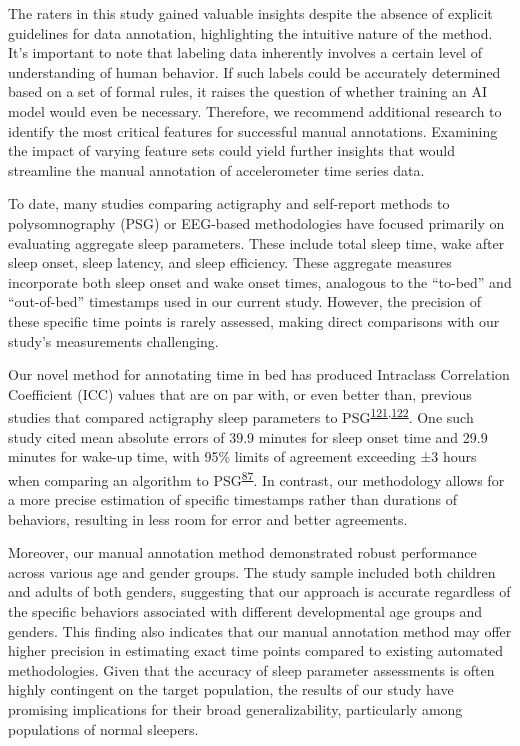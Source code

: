 \documentclass[
  10pt,
]{scrbook}
\begin{document}
The raters in this study gained valuable insights despite the absence of
explicit guidelines for data annotation, highlighting the intuitive
nature of the method. It's important to note that labeling data
inherently involves a certain level of understanding of human behavior.
If such labels could be accurately determined based on a set of formal
rules, it raises the question of whether training an AI model would even
be necessary. Therefore, we recommend additional research to identify
the most critical features for successful manual annotations. Examining
the impact of varying feature sets could yield further insights that
would streamline the manual annotation of accelerometer time series
data.

To date, many studies comparing actigraphy and self-report methods to
polysomnography (PSG) or EEG-based methodologies have focused primarily
on evaluating aggregate sleep parameters. These include total sleep
time, wake after sleep onset, sleep latency, and sleep efficiency. These
aggregate measures incorporate both sleep onset and wake onset times,
analogous to the ``to-bed'' and ``out-of-bed'' timestamps used in our
current study. However, the precision of these specific time points is
rarely assessed, making direct comparisons with our study's measurements
challenging.

Our novel method for annotating time in bed has produced Intraclass
Correlation Coefficient (ICC) values that are on par with, or even
better than, previous studies that compared actigraphy sleep parameters
to
PSG\textsuperscript{\protect\hyperlink{ref-haghayegh_application_2020}{121},\protect\hyperlink{ref-yavuz-kodat_2019}{122}}.
One such study cited mean absolute errors of 39.9 minutes for sleep
onset time and 29.9 minutes for wake-up time, with 95\% limits of
agreement exceeding ±3 hours when comparing an algorithm to
PSG\textsuperscript{\protect\hyperlink{ref-van_hees_estimating_2018}{87}}.
In contrast, our methodology allows for a more precise estimation of
specific timestamps rather than durations of behaviors, resulting in
less room for error and better agreements.

Moreover, our manual annotation method demonstrated robust performance
across various age and gender groups. The study sample included both
children and adults of both genders, suggesting that our approach is
accurate regardless of the specific behaviors associated with different
developmental age groups and genders. This finding also indicates that
our manual annotation method may offer higher precision in estimating
exact time points compared to existing automated methodologies. Given
that the accuracy of sleep parameter assessments is often highly
contingent on the target population, the results of our study have
promising implications for their broad generalizability, particularly
among populations of normal sleepers.
\end{document}
